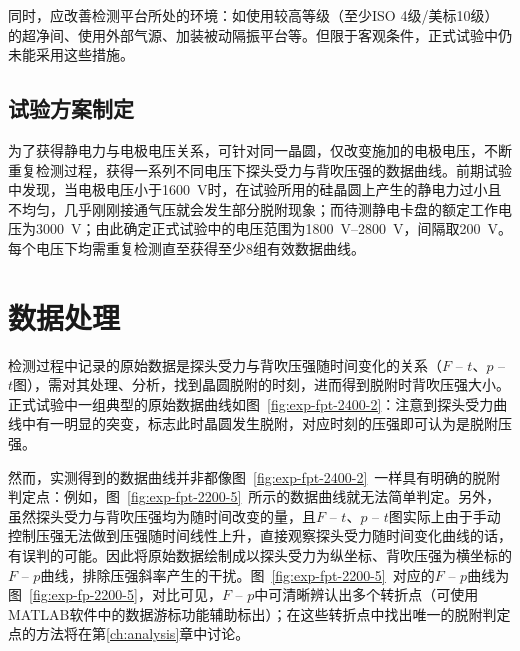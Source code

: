 同时，应改善检测平台所处的环境：如使用较高等级（至少ISO 4级/美标10级）的超净间、使用外部气源、加装被动隔振平台等。但限于客观条件，正式试验中仍未能采用这些措施。


\subsection{试验方案制定}\label{sec:exp-main-plan}

为了获得静电力与电极电压关系，可针对同一晶圆，仅改变施加的电极电压，不断重复检测过程，获得一系列不同电压下探头受力与背吹压强的数据曲线。前期试验中发现，当电极电压小于\SI{1600}{\V}时，在试验所用的硅晶圆上产生的静电力过小且不均匀，几乎刚刚接通气压就会发生部分脱附现象；而待测静电卡盘的额定工作电压为\SI{3000}{\V}；由此确定正式试验中的电压范围为\SIrange{1800}{2800}{\V}，间隔取\SI{200}{\V}。每个电压下均需重复检测直至获得至少8组有效数据曲线。



\section{数据处理}\label{sec:exp-data}

检测过程中记录的原始数据是探头受力与背吹压强随时间变化的关系（$F$ -- $t$、$p$ -- $t$图），需对其处理、分析，找到晶圆脱附的时刻，进而得到脱附时背吹压强大小。正式试验中一组典型的原始数据曲线如图~\ref{fig:exp-fpt-2400-2}：注意到探头受力曲线中有一明显的突变，标志此时晶圆发生脱附，对应时刻的压强即可认为是脱附压强。

然而，实测得到的数据曲线并非都像图~\ref{fig:exp-fpt-2400-2}~一样具有明确的脱附判定点：例如，图~\ref{fig:exp-fpt-2200-5}~所示的数据曲线就无法简单判定。另外，虽然探头受力与背吹压强均为随时间改变的量，且$F$ -- $t$、$p$ -- $t$图实际上由于手动控制压强无法做到压强随时间线性上升，直接观察探头受力随时间变化曲线的话，有误判的可能。因此将原始数据绘制成以探头受力为纵坐标、背吹压强为横坐标的$F$ -- $p$曲线，排除压强斜率产生的干扰。图~\ref{fig:exp-fpt-2200-5}~对应的$F$ -- $p$曲线为图~\ref{fig:exp-fp-2200-5}，对比可见，$F$ -- $p$中可清晰辨认出多个转折点（可使用MATLAB软件中的数据游标功能辅助标出）；在这些转折点中找出唯一的脱附判定点的方法将在第\ref{ch:analysis}章中讨论。



